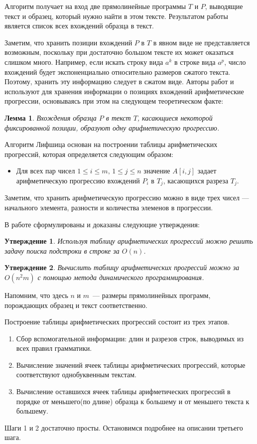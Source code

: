 \documentclass[14pt]{article}
\newtheorem{lemma}{Лемма}
\newtheorem{claim}{Утверждение}[section]
\begin{document}
Алгоритм получает на вход две прямолинейные программы $T$ и $P$, выводящие текст и образец, который нужно найти в этом тексте. 
Результатом работы является список всех вхождений образца в текст.

Заметим, что хранить позиции вхождений $P$ в $T$ в явном виде не представляется возможным, поскольку при достаточно большом тексте их может оказаться слишком много. Например, если искать строку вида $a^k$ в строке вида $a^p$, число вхождений будет экспоненциально относительно размеров сжатого текста. Поэтому, хранить эту информацию следует в сжатом виде. Авторы работ \cite{Lifshits} и \cite{1997} используют для хранения информации о позициях вхождений арифметические прогрессии, основываясь при этом на следующем теоретическом факте:

\begin{lemma} \label{main}
Вхождения образца $P$ в текст $T$, касающиеся некоторой фиксированной позиции, образуют одну арифметическую прогрессию.
\end{lemma}

Алгоритм Лифшица основан на построении таблицы арифметических прогрессий, которая определяется следующим образом:

\begin{itemize}
\item Для всех  пар чисел $1 \leqslant i \leqslant m,\, 1 \leqslant j \leqslant n$ значение $A[i,j]$ задает арифметическую прогрессию вхождений 
$P_i$ в $T_j$, касающихся разреза $T_j$.
\end{itemize}

Заметим, что хранить арифметическую прогрессию можно в виде трех чисел --- начального элемента, разности и количества
элеменов в прогрессии.

В работе \cite{Lifshits} сформулированы и доказаны следующие утверждения:
\begin{claim} 
Используя таблицу арифметических прогрессий можно решить задачу поиска подстроки в строке за $O(n)$.
\end{claim}
\begin{claim}
Вычислить таблицу арифметических прогрессий можно за $O(n^2m)$ с помощью метода динамического программирования.
\end{claim}

Напомним, что здесь $n$ и $m$~--- размеры прямолинейных программ, порождающих образец и текст соответственно.

Построение таблицы арифметических прогрессий состоит из трех этапов.
\begin{enumerate}
\item Сбор вспомогательной информации: длин и разрезов строк, выводимых из всех правил грамматики.
\item Вычисление значений ячеек таблицы арифметических прогрессий, которые соответствуют однобуквенным текстам.
\item Вычисление оставшихся ячеек таблицы арифметических прогрессий в порядке от меньшего(по длине) образца к большему и от меньшего текста к большему.
\end{enumerate}
Шаги 1 и 2 достаточно просты. Остановимся подробнее на описании третьего шага.
\end{document}
